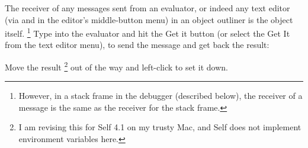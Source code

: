 \documentclass[letterpaper,10pt,english]{sphinxmanual}
\begin{document}
The receiver of any messages sent from an evaluator, or indeed any text editor (via  and 
in the editor’s middle-button menu) in an object outliner is the object itself. \footnote{
However, in a stack frame in the debugger (described below), the receiver of a message is the same as the receiver for the stack frame.
} Type  into
the evaluator and hit the Get it button (or select the Get It from the text editor menu), to send
the message and get back the result:
\begin{figure}[htbp]\begin{flushleft}

\end{flushleft}\end{figure}

Move the result \footnote{
I am revising this for Self 4.1 on my trusty Mac, and Self does not implement environment variables here.
} out of the way and left-click to set it down.
\end{document}
